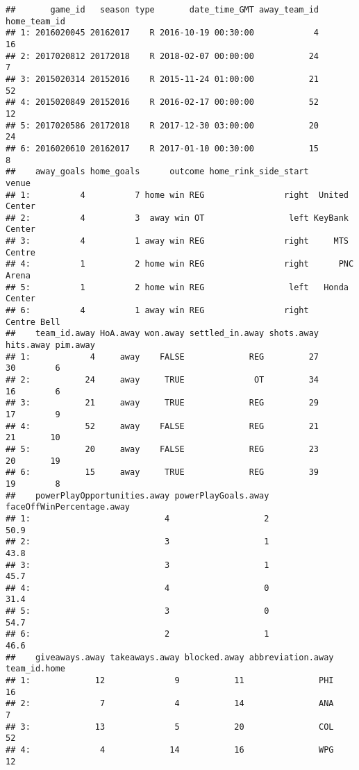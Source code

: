 \documentclass[
]{article}
\begin{document}
\begin{verbatim}
##       game_id   season type       date_time_GMT away_team_id home_team_id
## 1: 2016020045 20162017    R 2016-10-19 00:30:00            4           16
## 2: 2017020812 20172018    R 2018-02-07 00:00:00           24            7
## 3: 2015020314 20152016    R 2015-11-24 01:00:00           21           52
## 4: 2015020849 20152016    R 2016-02-17 00:00:00           52           12
## 5: 2017020586 20172018    R 2017-12-30 03:00:00           20           24
## 6: 2016020610 20162017    R 2017-01-10 00:30:00           15            8
##    away_goals home_goals      outcome home_rink_side_start          venue
## 1:          4          7 home win REG                right  United Center
## 2:          4          3  away win OT                 left KeyBank Center
## 3:          4          1 away win REG                right     MTS Centre
## 4:          1          2 home win REG                right      PNC Arena
## 5:          1          2 home win REG                 left   Honda Center
## 6:          4          1 away win REG                right    Centre Bell
##    team_id.away HoA.away won.away settled_in.away shots.away hits.away pim.away
## 1:            4     away    FALSE             REG         27        30        6
## 2:           24     away     TRUE              OT         34        16        6
## 3:           21     away     TRUE             REG         29        17        9
## 4:           52     away    FALSE             REG         21        21       10
## 5:           20     away    FALSE             REG         23        20       19
## 6:           15     away     TRUE             REG         39        19        8
##    powerPlayOpportunities.away powerPlayGoals.away faceOffWinPercentage.away
## 1:                           4                   2                      50.9
## 2:                           3                   1                      43.8
## 3:                           3                   1                      45.7
## 4:                           4                   0                      31.4
## 5:                           3                   0                      54.7
## 6:                           2                   1                      46.6
##    giveaways.away takeaways.away blocked.away abbreviation.away team_id.home
## 1:             12              9           11               PHI           16
## 2:              7              4           14               ANA            7
## 3:             13              5           20               COL           52
## 4:              4             14           16               WPG           12

\end{verbatim}
\end{document}
